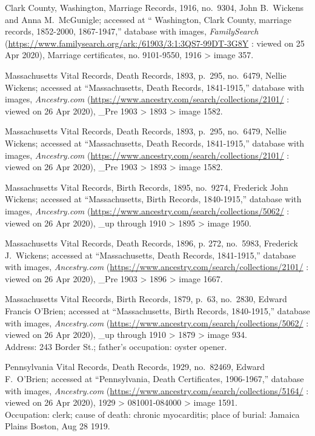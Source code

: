 \begin{thebibliography}{999}
Clark County, Washington, Marriage Records, 1916, no.\ 9304, John B.\ Wickens and Anna M.\ McGunigle; accessed at `` Washington, Clark County, marriage records, 1852-2000, 1867-1947,'' database with images, \textit{FamilySearch} (\url{https://www.familysearch.org/ark:/61903/3:1:3QS7-99DT-3G8Y} : viewed on 25 Apr 2020), Marriage certificates, no. 9101-9550, 1916 > image 357.

Massachusetts Vital Records, Death Records, 1893, p.\ 295, no.\ 6479, Nellie Wickens; accessed at ``Massachusetts, Death Records, 1841-1915,'' database with images, \textit{Ancestry.com} (\url{https://www.ancestry.com/search/collections/2101/} : viewed on 26 Apr 2020), \_Pre 1903 > 1893 > image 1582.

Massachusetts Vital Records, Death Records, 1893, p.\ 295, no.\ 6479, Nellie Wickens; accessed at ``Massachusetts, Death Records, 1841-1915,'' database with images, \textit{Ancestry.com} (\url{https://www.ancestry.com/search/collections/2101/} : viewed on 26 Apr 2020), \_Pre 1903 > 1893 > image 1582.

Massachusetts Vital Records, Birth Records, 1895, no.\ 9274, Frederick John Wickens; accessed at ``Massachusetts, Birth Records, 1840-1915,'' database with images, \textit{Ancestry.com} (\url{https://www.ancestry.com/search/collections/5062/} : viewed on 26 Apr 2020), \_up through 1910 > 1895 > image 1950.

Massachusetts Vital Records, Death Records, 1896, p. 272, no.\ 5983, Frederick J.\ Wickens; accessed at ``Massachusetts, Death Records, 1841-1915,'' database with images, \textit{Ancestry.com} (\url{https://www.ancestry.com/search/collections/2101/} : viewed on 26 Apr 2020), \_Pre 1903 > 1896 > image 1667.


Massachusetts Vital Records, Birth Records, 1879, p.\ 63, no.\ 2830, Edward Francis O'Brien; accessed at ``Massachusetts, Birth Records, 1840-1915,'' database with images, \textit{Ancestry.com} (\url{https://www.ancestry.com/search/collections/5062/} : viewed on 26 Apr 2020), \_up through 1910 > 1879 > image 934.\\
Address: 243 Border St.; father's occupation: oyster opener.

Pennsylvania Vital Records, Death Records, 1929, no.\ 82469, Edward F.\ O'Brien; accessed at ``Pennsylvania, Death Certificates, 1906-1967,'' database with images, \textit{Ancestry.com} (\url{https://www.ancestry.com/search/collections/5164/} : viewed on 26 Apr 2020), 1929 > 081001-084000 > image 1591.\\
Occupation: clerk; cause of death: chronic myocarditis; place of burial: Jamaica Plains Boston, Aug 28 1919.


\end{thebibliography}
